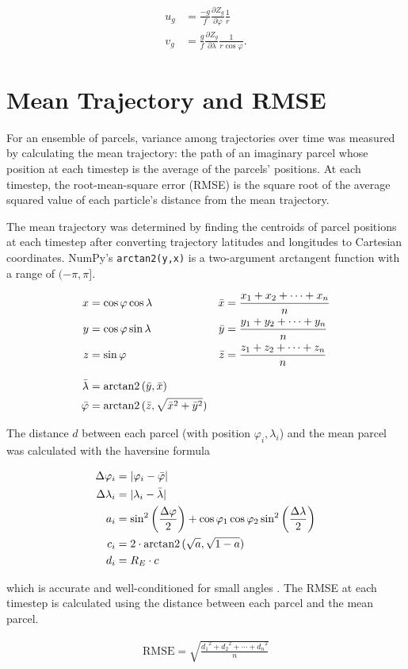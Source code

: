 \begin{align}
    u_g &= \frac{-g}{f} \frac{\partial Z_g}{\partial \varphi} \frac{1}{r} \\
    v_g &= \frac{g}{f} \frac{\partial Z_g}{\partial \lambda} \frac{1}{r \cos{\varphi}}.
\end{align}

\section{Mean Trajectory and RMSE}
For an ensemble of parcels, variance among trajectories over time was measured by calculating the mean trajectory: the path of an imaginary parcel whose position at each timestep is the average of the parcels' positions.
At each timestep, the root-mean-square error (RMSE) is the square root of the average squared value of each particle's distance from the mean trajectory.

The mean trajectory was determined by finding the centroids of parcel positions at each timestep after converting trajectory latitudes and longitudes to Cartesian coordinates. 
NumPy's \texttt{arctan2(y,x)} is a two-argument arctangent function with a range of $(-\pi, \pi]$.

\begin{align}
x &= \cos \varphi \cos \lambda & \bar{x} &= \frac{x_1 + x_2 + \cdots + x_n}{n} \\
y &= \cos \varphi \sin \lambda & \bar{y} &= \frac{y_1 + y_2 + \cdots + y_n}{n} \\
z &= \sin \varphi & \bar{z} &= \frac{z_1 + z_2 + \cdots + z_n}{n} \\[2ex]
\bar{\lambda} &= \operatorname{arctan2}{(\bar{y},\bar{x})} \\
\bar{\varphi} &= \operatorname{arctan2}{(\bar{z}, \sqrt{\bar{x}^2 + \bar{y}^2})}
\end{align}

The distance $d$ between each parcel (with position $\varphi_i, \lambda_i$) and the mean parcel was calculated with the haversine formula

\begin{align}
\Delta \varphi_i &= | \varphi_i - \bar{\varphi}| \\
\Delta \lambda_i &= |\lambda_i - \bar{\lambda}| \\
a_i &= \sin^2 \left ( \frac{\Delta \varphi}{2} \right ) + \cos{\varphi_1}  \cos{\varphi_2} \sin^2 \left ( \frac{\Delta \lambda}{2} \right ) \\
c_i &= 2 \cdot \operatorname{arctan2}{(\sqrt{a}, \sqrt{1 - a})} \\
d_i &= R_E \cdot c
\end{align}

which is accurate and well-conditioned for small angles \cite{sinnott_virtues_1984}. 
The RMSE at each timestep is calculated using the distance between each parcel and the mean parcel.

\begin{align}
\text{RMSE} = \sqrt{\frac{{d_1}^2 + {d_2}^2 + \cdots + {d_n}^2}{n}}
\end{align}
